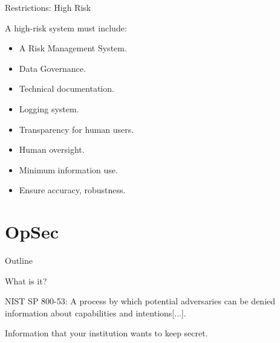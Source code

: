 \documentclass[24pt]{beamer}
\begin{document}
\begin{frame}{Restrictions: High Risk}
	\begin{block}{A high-risk system must include:}
		\begin{itemize}
			\item A Risk Management System.
			\item Data Governance.
			\item Technical documentation.
			\item Logging system.
			\item Transparency for human users.
			\item Human oversight.
			\item Minimum information use.
			\item Ensure accuracy, robustness.
		\end{itemize}
	\end{block}
\end{frame}
	
	
\section{OpSec}

\begin{frame}{Outline}
	\tableofcontents[currentsection]
\end{frame}

\begin{frame}{What is it?}
	\begin{definition}[OpSec]
		NIST SP 800-53: A process by which potential adversaries can be denied information about capabilities and intentions[...].
	\end{definition}
	\pause
	\begin{alertblock}{}
		Information that your institution wants to keep secret.
	\end{alertblock}
\end{frame}
\end{document}
